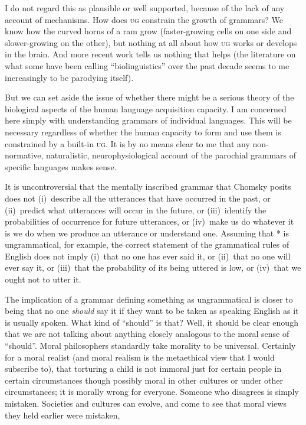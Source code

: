 \documentclass[output=paper]{langscibook}
\begin{document}
I do not regard this as plausible or well supported, because of the lack of any account of mechanisms.  How does \textsc{ug} constrain the growth of grammars? We know how the curved horns of a ram grow (faster-growing cells on one side and slower-growing on the other), but nothing at all about how \textsc{ug} works or develops in the brain. And more recent work tells us nothing that helps (the literature on what some have been calling ``biolinguistics'' over the past decade seems to me increasingly to be parodying itself).

But we can set aside the issue of whether there might be a serious theory of the biological aspects of the human language acquisition capacity. I am concerned here simply with understanding grammars of individual languages. This will be necessary regardless of whether the human capacity to form and use them is constrained by a built-in \textsc{ug}.  It is by no means clear to me that any non-normative, naturalistic, neurophysiological account of the parochial grammars of specific languages makes sense.

It is uncontroversial that the mentally inscribed grammar that Chomsky posits does not (i)~describe all the utterances that have occurred in the past, or (ii)~predict what utterances will occur in the future, or (iii)~identify the probabilities of occurrence for future utterances, or (iv)~make us do whatever it is we do when we produce an utterance or understand one.  Assuming that * is ungrammatical, for example, the correct statement of the grammatical rules of English does not imply (i)~that no one has ever said it, or (ii)~that no one will ever say it, or (iii)~that the probability of its being uttered is low, or (iv)~that we ought not to utter it.

The implication of a grammar defining something as ungrammatical is closer to being that no one \emph{should} say it if they want to be taken as speaking English as it is usually spoken.  What kind of ``should'' is that? Well, it should be clear enough that we are not talking about anything closely analogous to the moral sense of ``should''.  Moral philosophers standardly take morality to be universal.  Certainly for a moral realist (and moral realism is the metaethical view that I would subscribe to), that torturing a child is not immoral just for certain people in certain circumstances though possibly moral in other cultures or under other circumstances; it is morally wrong for everyone.  Someone who disagrees is simply mistaken. Societies and cultures can evolve, and come to see that moral views they held earlier were mistaken,
\end{document}
